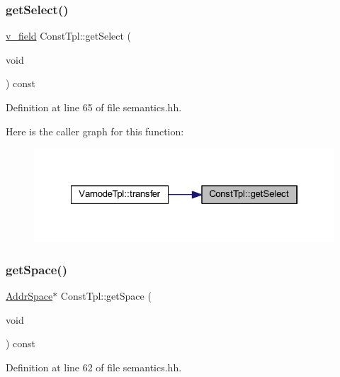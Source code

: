 \subsubsection{\texorpdfstring{getSelect()}{getSelect()}}
{\footnotesize\ttfamily \mbox{\hyperlink{class_const_tpl_a4aa1b485e0cac884006d1aa35b3b0c57}{v\+\_\+field}} Const\+Tpl\+::get\+Select (\begin{DoxyParamCaption}\item[{void}]{ }\end{DoxyParamCaption}) const\hspace{0.3cm}{\ttfamily [inline]}}



Definition at line 65 of file semantics.\+hh.

Here is the caller graph for this function\+:
\nopagebreak
\begin{figure}[H]
\begin{center}
\leavevmode
\includegraphics[width=322pt]{class_const_tpl_a4bc27aa15f85b5fb4a621a7488b9f6fc_icgraph}
\end{center}
\end{figure}
\mbox{\label{class_const_tpl_ab23dfe352075812889649cffec63f80a}} 
\subsubsection{\texorpdfstring{getSpace()}{getSpace()}}
{\footnotesize\ttfamily \mbox{\hyperlink{class_addr_space}{Addr\+Space}}$\ast$ Const\+Tpl\+::get\+Space (\begin{DoxyParamCaption}\item[{void}]{ }\end{DoxyParamCaption}) const\hspace{0.3cm}{\ttfamily [inline]}}



Definition at line 62 of file semantics.\+hh.

